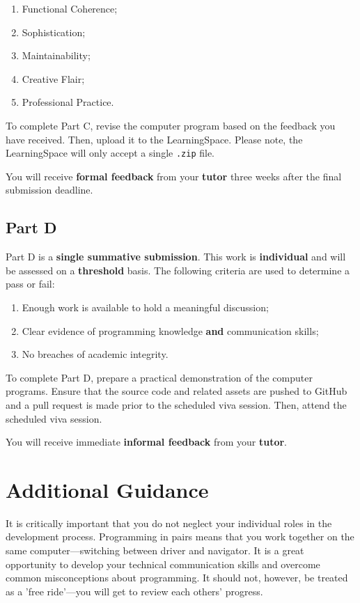\documentclass{../fal_assignment}
\begin{document}
\begin{enumerate}[label=(\alph*)]
	\item Functional Coherence;
	\item Sophistication;
	\item Maintainability;
	\item Creative Flair;
	\item Professional Practice.	
\end{enumerate}

To complete Part C, revise the computer program based on the feedback you have received. Then, upload it to the LearningSpace. Please note, the LearningSpace will only accept a single \texttt{.zip} file.

You will receive \textbf{formal feedback} from your \textbf{tutor} three weeks after the final submission deadline.

\subsection*{Part D}

Part D is a \textbf{single summative submission}. This work is \textbf{individual} and will be assessed on a \textbf{threshold} basis.  The following criteria are used to determine a pass or fail:

\begin{enumerate}[label=(\alph*)]
	\item Enough work is available to hold a meaningful discussion;
	\item Clear evidence of programming knowledge \textbf{and} communication skills;
	\item No breaches of academic integrity.
\end{enumerate}

To complete Part D, prepare a practical demonstration of the computer programs. Ensure that the source code and related assets are pushed to GitHub and a pull request is made prior to the scheduled viva session. Then, attend the scheduled viva session.

You will receive immediate \textbf{informal feedback} from your \textbf{tutor}.

\section*{Additional Guidance}

It is critically important that you do not neglect your individual roles in the development process. Programming in pairs means that you work together on the same computer---switching between driver and navigator. It is a great opportunity to develop your technical communication skills and overcome common misconceptions about programming. It should not, however, be treated as a 'free ride'---you will get to review each others' progress. 
\end{document}
